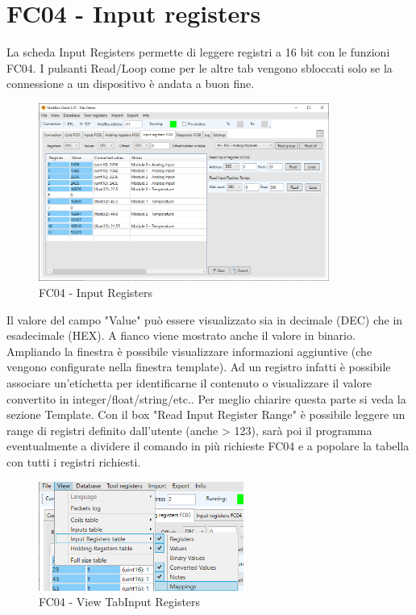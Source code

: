 \newpage
\section{FC04 - Input registers}

La scheda Input Registers permette di leggere registri a 16 bit con le funzioni FC04. I pulsanti
Read/Loop come per le altre tab vengono sbloccati solo se la connessione a un dispositivo è
andata a buon fine.

\begin{figure}[H]
\centering
\includegraphics[width=0.85\textwidth]{../Img/Modbus_Client_InputReg_00.PNG}
\caption{FC04 - Input Registers}
\end{figure}

Il valore del campo "Value" può essere visualizzato sia in decimale (DEC) che in esadecimale
(HEX). A fianco viene mostrato anche il valore in binario. Ampliando la finestra è possibile
visualizzare informazioni aggiuntive (che vengono configurate nella finestra template). Ad un
registro infatti è possibile associare un'etichetta per identificarne il contenuto o visualizzare il valore
convertito in integer/float/string/etc.. Per meglio chiarire questa parte si veda la sezione Template.
Con il box "Read Input Register Range" è possibile leggere un range di registri definito dall'utente
(anche > 123), sarà poi il programma eventualmente a dividere il comando in più richieste FC04 e
a popolare la tabella con tutti i registri richiesti.

\begin{figure}[H]
\centering
\includegraphics[width=0.60\textwidth]{../Img/Menu_View_InputReg.PNG}
\caption{FC04 - View TabInput Registers}
\end{figure}

